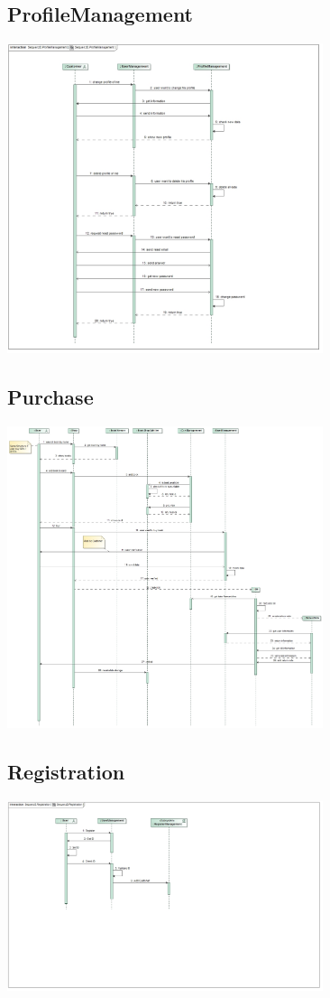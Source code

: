 \documentclass[a4paper]{article}
\begin{document}
\subsection{ProfileManagement}

\includegraphics[width=350px]{sd-profilemanagement.jpg}

\subsection{Purchase}

\includegraphics[width=350px]{sd-purchase.jpg}

\subsection{Registration}

\includegraphics[width=350px]{sd-registration.jpg}
\end{document}
